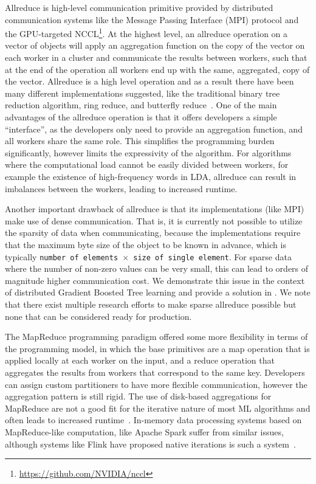 Allreduce is high-level communication primitive provided by distributed communication
systems like the Message Passing Interface (MPI) protocol \cite{mpi} and the
GPU-targeted NCCL\footnote{\url{https://github.com/NVIDIA/nccl}}. At the highest
level, an allreduce operation on a vector of objects will apply an aggregation
function on the copy of the vector on each worker in a cluster and communicate
the results between workers, such that at the end of the operation all workers end up with the same,
aggregated, copy of the vector. Allreduce is a high level operation and as a result there have been
many different implementations suggested, like the traditional
binary tree reduction algorithm, ring reduce, and butterfly reduce~\cite{allreduce}.
One of the main advantages of the allreduce operation is that it offers developers a simple ``interface'', as the developers only need to provide an aggregation function,
and all workers share the same role.
This simplifies the programming burden significantly, however limits the expressivity
of the algorithm. For algorithms where the computational load cannot be easily divided between
workers, for example the existence of high-frequency words in LDA\cite{lightLDA}, allreduce can result
in imbalances between the workers, leading to increased runtime\cite{straggler-ml, stale-sync-ps}.

Another important drawback of allreduce is that its implementations (like MPI) make use of dense communication. That is, it is currently
not possible to utilize the sparsity of data when communicating, because the implementations
require that the maximum byte size of the object to be known in advance, which is
typically \texttt{number of elements $\times$ size of single element}. For sparse
data where the number of non-zero values can be very small, this can lead to orders
of magnitude higher communication cost. We demonstrate this issue in the context
of distributed Gradient Boosted Tree learning and provide
a solution in \blockgbt. We note that there exist multiple research
efforts to make sparse allreduce possible \cite{sparse-comms-ml, sparse-allreduce, sparse-mpi}
but none that can be considered ready for production.


The MapReduce programming paradigm \cite{mapreduce} offered some more flexibility in terms of the
programming model, in which the base primitives are a map operation that is applied
locally at each worker on the input, and a reduce operation that aggregates the results
from workers that correspond to the same key. Developers can assign custom partitioners
to have more flexible communication, however the aggregation pattern is still rigid.
The use of disk-based aggregations for MapReduce are not a good fit for the iterative
nature of most ML algorithms and often leads to increased runtime~\cite{slow-learners-fast}.
In-memory data processing systems based on MapReduce-like computation, like Apache Spark \cite{spark}
suffer from similar issues, although systems like Flink have proposed native iterations
is such a system~\cite{flink-iterations}.

